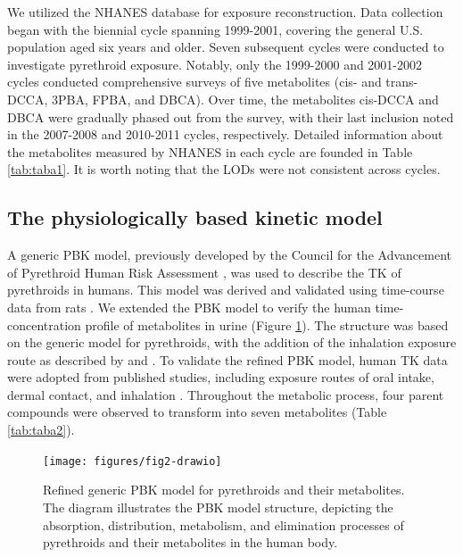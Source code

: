\documentclass[toxics,article,submit,pdftex,moreauthors]{Definitions/mdpi}
\begin{document}
We utilized the NHANES database for exposure reconstruction. Data
collection began with the biennial cycle spanning 1999-2001, covering
the general U.S. population aged six years and older. Seven subsequent
cycles were conducted to investigate pyrethroid exposure. Notably, only
the 1999-2000 and 2001-2002 cycles conducted comprehensive surveys of
five metabolites (cis- and trans-DCCA, 3PBA, FPBA, and DBCA). Over time,
the metabolites cis-DCCA and DBCA were gradually phased out from the
survey, with their last inclusion noted in the 2007-2008 and 2010-2011
cycles, respectively. Detailed information about the metabolites
measured by NHANES in each cycle are founded in Table \ref{tab:taba1}.
It is worth noting that the LODs were not consistent across cycles.

\subsection{The physiologically based kinetic
model}\label{the-physiologically-based-kinetic-model}

A generic PBK model, previously developed by the Council for the
Advancement of Pyrethroid Human Risk Assessment
\citep{song2019evaluation, mallick2020development, mallick_physiologically_2020},
was used to describe the TK of pyrethroids in humans. This model was
derived and validated using time-course data from rats
\citep{mirfazaelian_development_2006, tornero2010evaluation}. We
extended the PBK model to verify the human time-concentration profile of
metabolites in urine (Figure \ref{fig:fig2}). The structure was based on
the generic model for pyrethroids, with the addition of the inhalation
exposure route as described by \citet{beaudouin2010stochastic} and
\citet{quindroit2019estimating}. To validate the refined PBK model,
human TK data were adopted from published studies, including exposure
routes of oral intake, dermal contact, and inhalation
\citep{leng1997human, leng1997biological, ratelle2015toxicokinetics, ratelle2015time}.
Throughout the metabolic process, four parent compounds were observed to
transform into seven metabolites (Table \ref{tab:taba2}).

\begin{figure}[H]
\texttt{[image: figures/fig2-drawio]} \caption{Refined generic PBK model for pyrethroids and their metabolites. The diagram illustrates the PBK model structure, depicting the absorption, distribution, metabolism, and elimination processes of pyrethroids and their metabolites in the human body.}\label{fig:fig2}
\end{figure}
\end{document}
